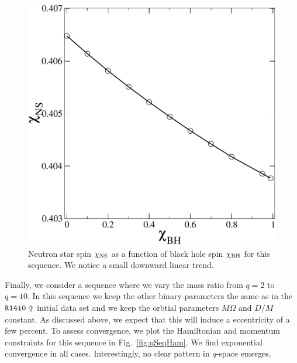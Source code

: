 \begin{figure}
\includegraphics[width=0.95\columnwidth]{chap4/chichi}
\caption[Measured neutron star spin plotted as a function of black hole spin.]{\label{fig:chichi}Neutron star spin $\chi_{\rm NS}$ as a function of black hole spin $\chi_{\rm BH}$ for this sequence. We notice a small downward linear trend.}
\end{figure}




Finally, we consider a sequence where we vary the mass ratio from
$q=2$ to $q=10$. In this sequence we keep the other binary parameters
the same as in the ${\tt R14i0\Uparrow}$ initial data set and we keep the
orbtial parameters $M\Omega$ and $D/M$ constant. As discussed above,
we expect that this will induce a eccentricity of a few percent. To
assess convergence, we plot the Hamiltonian and momentum constraints
for this sequence in Fig.~\ref{fig:qSeqHam}. We find exponential convergence in all
cases. Interestingly, no clear pattern in $q$-space emerges.


